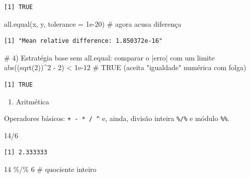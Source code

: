 \documentclass[
  letterpaper,
  DIV=11,
  numbers=noendperiod]{scrreprt}
\newenvironment{Shaded}{\begin{snugshade}}{\end{snugshade}}
\newcommand{\AttributeTok}[1]{\textcolor[rgb]{0.40,0.45,0.13}{#1}}
\newcommand{\CommentTok}[1]{\textcolor[rgb]{0.37,0.37,0.37}{#1}}
\newcommand{\DecValTok}[1]{\textcolor[rgb]{0.68,0.00,0.00}{#1}}
\newcommand{\FloatTok}[1]{\textcolor[rgb]{0.68,0.00,0.00}{#1}}
\newcommand{\FunctionTok}[1]{\textcolor[rgb]{0.28,0.35,0.67}{#1}}
\newcommand{\NormalTok}[1]{\textcolor[rgb]{0.00,0.23,0.31}{#1}}
\newcommand{\SpecialCharTok}[1]{\textcolor[rgb]{0.37,0.37,0.37}{#1}}
\providecommand{\tightlist}{%
  \setlength{\itemsep}{0pt}\setlength{\parskip}{0pt}}\usepackage{longtable,booktabs,array}
\begin{document}
\begin{verbatim}
[1] TRUE
\end{verbatim}

\begin{Shaded}
\begin{Highlighting}[]
\FunctionTok{all.equal}\NormalTok{(x, y, }\AttributeTok{tolerance =} \FloatTok{1e{-}20}\NormalTok{)  }\CommentTok{\# agora acusa diferença}
\end{Highlighting}
\end{Shaded}

\begin{verbatim}
[1] "Mean relative difference: 1.850372e-16"
\end{verbatim}

\begin{Shaded}
\begin{Highlighting}[]
\CommentTok{\# 4) Estratégia base sem all.equal: comparar o |erro| com um limite}
\FunctionTok{abs}\NormalTok{((}\FunctionTok{sqrt}\NormalTok{(}\DecValTok{2}\NormalTok{))}\SpecialCharTok{\^{}}\DecValTok{2} \SpecialCharTok{{-}} \DecValTok{2}\NormalTok{) }\SpecialCharTok{\textless{}} \FloatTok{1e{-}12} \CommentTok{\# TRUE (aceita "igualdade" numérica com folga)}
\end{Highlighting}
\end{Shaded}

\begin{verbatim}
[1] TRUE
\end{verbatim}

\begin{enumerate}
\def\labelenumi{\arabic{enumi})}
\setcounter{enumi}{1}
\tightlist
\item
  Aritmética
\end{enumerate}

Operadores básicos: \texttt{+\ -\ *\ /\ \^{}} e, ainda, divisão inteira
\texttt{\%/\%} e módulo \texttt{\%\%}.

\begin{Shaded}
\begin{Highlighting}[]
\DecValTok{14}\SpecialCharTok{/}\DecValTok{6}
\end{Highlighting}
\end{Shaded}

\begin{verbatim}
[1] 2.333333
\end{verbatim}

\begin{Shaded}
\begin{Highlighting}[]
\DecValTok{14} \SpecialCharTok{\%/\%} \DecValTok{6} \CommentTok{\# quociente inteiro}
\end{Highlighting}
\end{Shaded}
\end{document}
